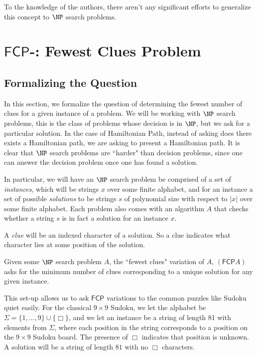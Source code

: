 \documentclass[runningheads,a4paper]{llncs}
\begin{document}
To the knowledge of the authors, there aren't any significant efforts to generalize this concept to $\NP$ search problems. 

\section{$\mathsf{FCP}$-: Fewest Clues Problem}
\label{sec:prelim}

\subsection{Formalizing the Question}

In this section, we formalize the question of determining the fewest number of clues for a given instance of a problem. We will be working with $\NP$ search problems, this is the class of problems whose decision is in $\NP$, but we ask for a particular solution. In the case of Hamiltonian Path, instead of asking does there exists a Hamiltonian path, we are asking to present a Hamiltonian path. It is clear that $\NP$ search problems are ``harder" than decision problems, since one can answer the decision problem once one has found a solution.

In particular, we will have an $\NP$ search problem be comprised of a set of \emph{instances}, which will be strings $x$ over some finite alphabet, and for an instance a set of possible \emph{solutions} to be strings $s$ of polynomial size with respect to $|x|$ over some finite alphabet. Each problem also comes with an algorithm $A$ that checks whether a string $s$ is in fact a solution for an instance $x$.

A \emph{clue} will be an indexed character of a solution. So a clue indicates what character lies at some position of the solution.

\begin{definition}
Given some $\NP$ search problem $A$, the ``fewest clues" variation of $A$, $(\mathsf{FCP} A)$ asks for the minimum number of clues corresponding to a unique solution for any given instance.
\end{definition}

This set-up allows us to ask $\mathsf{FCP}$ variations to the common puzzles like Sudoku quiet easily. For the classical $9 \times 9$ Sudoku, we let the alphabet be $\Sigma = \{ 1, ..., 9 \} \cup \{ \Box \}$, and we let an instance be a string of length 81 with elements from $\Sigma$, where each position in the string corresponds to a position on the $9 \times 9$ Sudoku board. The presence of $\Box$ indicates that position is unknown. A solution will be a string of length $81$ with no $\Box$ characters. 
\end{document}
